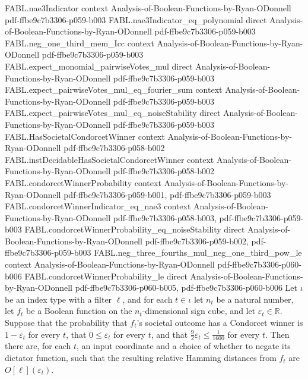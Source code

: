 \begin{theorem}
\proofstep
  {FABL.nae3Indicator}
  {context}
  {Analysis-of-Boolean-Functions-by-Ryan-ODonnell}
  {pdf-ffbe9c7b3306-p059-b003}
\proofstep
  {FABL.nae3Indicator_eq_polynomial}
  {direct}
  {Analysis-of-Boolean-Functions-by-Ryan-ODonnell}
  {pdf-ffbe9c7b3306-p059-b003}
\proofstep
  {FABL.neg_one_third_mem_Icc}
  {context}
  {Analysis-of-Boolean-Functions-by-Ryan-ODonnell}
  {pdf-ffbe9c7b3306-p059-b003}
\proofstep
  {FABL.expect_monomial_pairwiseVotes_mul}
  {direct}
  {Analysis-of-Boolean-Functions-by-Ryan-ODonnell}
  {pdf-ffbe9c7b3306-p059-b003}
\proofstep
  {FABL.expect_pairwiseVotes_mul_eq_fourier_sum}
  {context}
  {Analysis-of-Boolean-Functions-by-Ryan-ODonnell}
  {pdf-ffbe9c7b3306-p059-b003}
\proofstep
  {FABL.expect_pairwiseVotes_mul_eq_noiseStability}
  {direct}
  {Analysis-of-Boolean-Functions-by-Ryan-ODonnell}
  {pdf-ffbe9c7b3306-p059-b003}
\proofstep
  {FABL.HasSocietalCondorcetWinner}
  {context}
  {Analysis-of-Boolean-Functions-by-Ryan-ODonnell}
  {pdf-ffbe9c7b3306-p058-b002}
\proofstep
  {FABL.instDecidableHasSocietalCondorcetWinner}
  {context}
  {Analysis-of-Boolean-Functions-by-Ryan-ODonnell}
  {pdf-ffbe9c7b3306-p058-b002}
\proofstep
  {FABL.condorcetWinnerProbability}
  {context}
  {Analysis-of-Boolean-Functions-by-Ryan-ODonnell}
  {pdf-ffbe9c7b3306-p059-b001,
    pdf-ffbe9c7b3306-p059-b003}
\proofstep
  {FABL.condorcetWinnerIndicator_eq_nae3}
  {context}
  {Analysis-of-Boolean-Functions-by-Ryan-ODonnell}
  {pdf-ffbe9c7b3306-p058-b003,
    pdf-ffbe9c7b3306-p059-b003}
\proofstep
  {FABL.condorcetWinnerProbability_eq_noiseStability}
  {direct}
  {Analysis-of-Boolean-Functions-by-Ryan-ODonnell}
  {pdf-ffbe9c7b3306-p059-b002,
    pdf-ffbe9c7b3306-p059-b003}
\proofstep
  {FABL.neg_three_fourths_mul_neg_one_third_pow_le}
  {context}
  {Analysis-of-Boolean-Functions-by-Ryan-ODonnell}
  {pdf-ffbe9c7b3306-p060-b006}
\proofstep
  {FABL.condorcetWinnerProbability_le}
  {direct}
  {Analysis-of-Boolean-Functions-by-Ryan-ODonnell}
  {pdf-ffbe9c7b3306-p060-b005,
    pdf-ffbe9c7b3306-p060-b006}
Let $\iota$ be an index type with a filter $\ell$, and for each $t\in\iota$ let $n_t$ be
a natural number, let $f_t$ be a Boolean function on the $n_t$-dimensional sign cube,
and let $\varepsilon_t\in\mathbb{R}$. Suppose that the probability that $f_t$'s societal
outcome has a Condorcet winner is $1-\varepsilon_t$ for every $t$, that
$0\leq\varepsilon_t$ for every $t$, and that
$\frac{9}{2}\varepsilon_t\leq\frac{1}{1600}$ for every $t$. Then there are, for each
$t$, an input coordinate and a choice of whether to negate its dictator function, such
that the resulting relative Hamming distances from $f_t$ are $O[\ell](\varepsilon_t)$.
\end{theorem}


